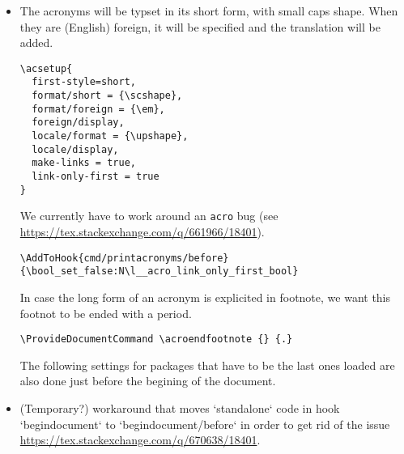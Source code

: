\documentclass{letgut}
\begin{document}
\begin{itemize}
default set to \lstinline+subbibliography+.
\begin{lstlisting}
\NewCommandCopy{\__letgut_old_printbibliography}{
  \printbibliography
}
\RenewDocumentCommand {\printbibliography} { O{} } {
  \phantomsection
  \__letgut_old_printbibliography[#1]
  \bool_if:NT \g__letgut_included_files_attached_bool {
    \seq_map_inline:Nn \g__letgut_added_bib_resources_seq {
      \file_if_exist:nTF {##1}{
        \seq_gput_right:Nn \g__letgut_included_files_seq {
          \attachfile[
            description={
              Fichier~ bibliographique~ utilisé~ dans~ le~
              présent~ article~ (fichier~ `\tl_to_str:n{##1}`)
            },
            mimetype=application/x-bib
          ]
          {\tl_to_str:n{##1}}
        }
      }
    }
  }
}
\end{lstlisting}
 For printing the bibliography, we define two new bibheadings for the
structure levels \lstinline+\title+ and \lstinline+\subtitle+.
\begin{lstlisting}
\defbibheading{title}[\refname]{%
  \title{#1}}
\defbibheading{subtitle}[\refname]{%
  \subtitle{#1}}
\end{lstlisting}
\item The acronyms will be typset in its short form, with small caps shape. When they are
(English) foreign, it will be specified and the translation will be added.
\begin{lstlisting}
\acsetup{
  first-style=short,
  format/short = {\scshape},
  format/foreign = {\em},
  foreign/display,
  locale/format = {\upshape},
  locale/display,
  make-links = true,
  link-only-first = true
}
\end{lstlisting}

We currently have to work around an \lstinline+acro+ bug (see \url{https://tex.stackexchange.com/q/661966/18401}).

\begin{lstlisting}
\AddToHook{cmd/printacronyms/before}{\bool_set_false:N\l__acro_link_only_first_bool}
\end{lstlisting}

In case the long form of an acronym is explicited in footnote, we want this
footnot to be ended with a period.
\begin{lstlisting}
\ProvideDocumentCommand \acroendfootnote {} {.}
\end{lstlisting}

The following settings for packages that have to be the last ones loaded are
also done just before the begining of the document.

\item (Temporary?) workaround that moves `standalone` code in hook `begindocument`
to `begindocument/before` in order to get rid of the issue
\url{https://tex.stackexchange.com/q/670638/18401}.
\end{itemize}
\end{document}

